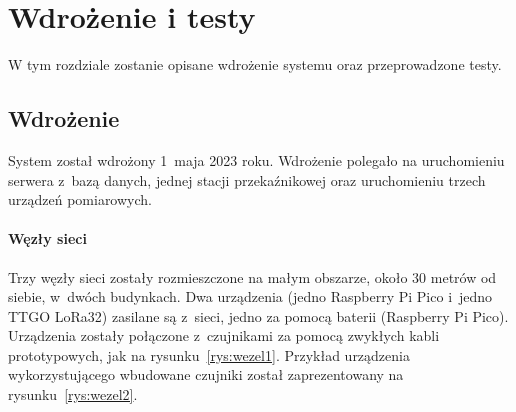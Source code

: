 \chapter{Wdrożenie i testy}
W tym rozdziale zostanie opisane wdrożenie systemu oraz przeprowadzone testy.
\section{Wdrożenie}
System został wdrożony 1~maja 2023 roku.
Wdrożenie polegało na uruchomieniu serwera z~bazą danych, jednej stacji przekaźnikowej oraz uruchomieniu trzech urządzeń pomiarowych.

\subsubsection{Węzły sieci}

Trzy węzły sieci zostały rozmieszczone na małym obszarze, około 30 metrów od siebie, w~dwóch budynkach.
Dwa urządzenia (jedno Raspberry Pi Pico i~jedno TTGO LoRa32) zasilane są z~sieci, jedno za pomocą baterii (Raspberry Pi Pico).
Urządzenia zostały połączone z~czujnikami za pomocą zwykłych kabli prototypowych, jak na rysunku~\ref{rys:wezel1}. %
Przykład urządzenia wykorzystującego wbudowane czujniki został zaprezentowany na rysunku~\ref{rys:wezel2}.

